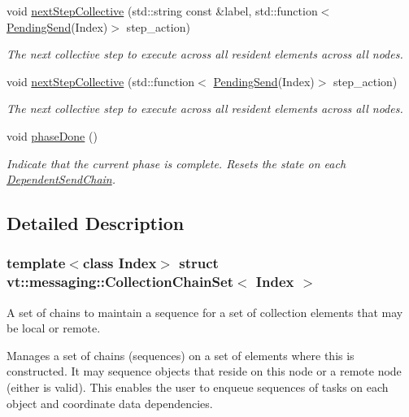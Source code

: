 \begin{DoxyCompactItemize}
void \hyperlink{classvt_1_1messaging_1_1_collection_chain_set_a095bc4907c3bd60668483de52b79b08e}{next\+Step\+Collective} (std\+::string const \&label, std\+::function$<$ \hyperlink{structvt_1_1messaging_1_1_pending_send}{Pending\+Send}(Index)$>$ step\+\_\+action)
\begin{DoxyCompactList}\small\item\em The next collective step to execute across all resident elements across all nodes. \end{DoxyCompactList}\item 
void \hyperlink{classvt_1_1messaging_1_1_collection_chain_set_a7d226984e696278b9ca7e539c974bab4}{next\+Step\+Collective} (std\+::function$<$ \hyperlink{structvt_1_1messaging_1_1_pending_send}{Pending\+Send}(Index)$>$ step\+\_\+action)
\begin{DoxyCompactList}\small\item\em The next collective step to execute across all resident elements across all nodes. \end{DoxyCompactList}\item 
void \hyperlink{classvt_1_1messaging_1_1_collection_chain_set_afcb749b22063068d060f35fdcd2320b3}{phase\+Done} ()
\begin{DoxyCompactList}\small\item\em Indicate that the current phase is complete. Resets the state on each {\ttfamily \hyperlink{classvt_1_1messaging_1_1_dependent_send_chain}{Dependent\+Send\+Chain}}. \end{DoxyCompactList}\end{DoxyCompactItemize}


\subsection{Detailed Description}
\subsubsection*{template$<$class Index$>$\newline
struct vt\+::messaging\+::\+Collection\+Chain\+Set$<$ Index $>$}

A set of chains to maintain a sequence for a set of collection elements that may be local or remote. 

Manages a set of chains (sequences) on a set of elements where this is constructed. It may sequence objects that reside on this node or a remote node (either is valid). This enables the user to enqueue sequences of tasks on each object and coordinate data dependencies. 

